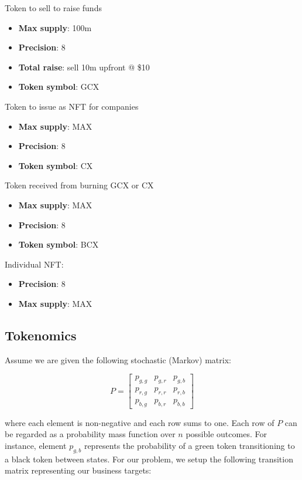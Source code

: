 \documentclass{article}
\begin{document}
Token to sell to raise funds
\begin{itemize}
\item \textbf{Max supply}: 100m
\item \textbf{Precision}: 8
\item \textbf{Total raise}: sell 10m upfront @ \$10
\item \textbf{Token symbol}: GCX
\end{itemize}

Token to issue as NFT for companies
\begin{itemize}
\item \textbf{Max supply}: MAX
\item \textbf{Precision}: 8
\item \textbf{Token symbol}: CX
\end{itemize}

Token received from burning GCX or CX
\begin{itemize}
\item \textbf{Max supply}: MAX
\item \textbf{Precision}: 8
\item \textbf{Token symbol}: BCX
\end{itemize}

Individual NFT:
\begin{itemize}
\item \textbf{Precision}: 8
\item \textbf{Max supply}: MAX
\end{itemize}

\subsection{Tokenomics}
\label{section:token_model}

Assume we are given the following stochastic (Markov) matrix:

\begin{equation*}
P = 
\begin{bmatrix}
p_{g,g} & p_{g,r}  & p_{g,b} \\
p_{r,g} & p_{r,r}  & p_{r,b} \\
p_{b,g} & p_{b,r} & p_{b,b} 
\end{bmatrix}
\end{equation*}

where each element is non-negative and each row sums to one. Each row of $P$ can be regarded as a probability mass function over $n$ possible outcomes. For instance, element $p_{g,b}$ represents the probability of a green token transitioning to a black token between states. For our problem, we setup the following transition matrix representing our business targets:
\end{document}
